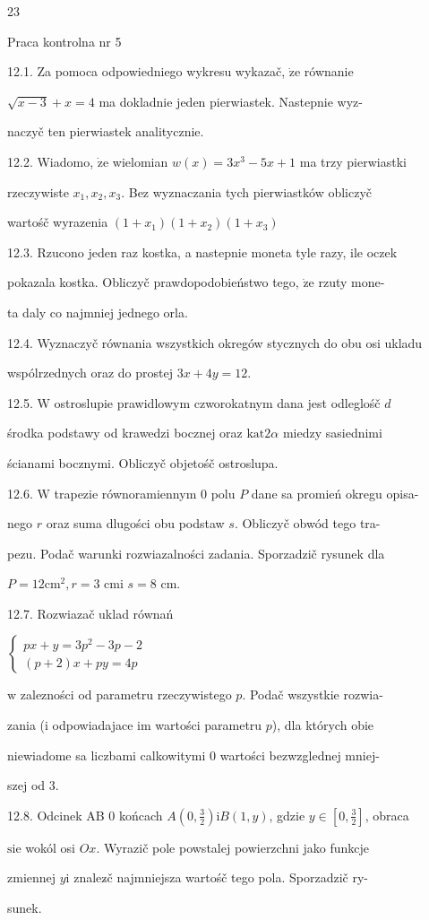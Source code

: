 \documentclass[a4paper,12pt]{article}
\begin{document}
23

Praca kontrolna nr 5

12.1. Za pomoca odpowiedniego wykresu wykazač, $\dot{\mathrm{z}}\mathrm{e}$ równanie

$\sqrt{x-3}+x = 4$ ma dokladnie jeden pierwiastek. Nastepnie wyz-

naczyč ten pierwiastek analitycznie.

12.2. Wiadomo, $\dot{\mathrm{z}}\mathrm{e}$ wielomian $w(x) = 3x^{3}-5x+1$ ma trzy pierwiastki

rzeczywiste $x_{1}, x_{2}, x_{3}$. Bez wyznaczania tych pierwiastków obliczyč

wartośč wyrazenia $(1+x_{1})(1+x_{2})(1+x_{3})$

12.3. Rzucono jeden raz kostka, a nastepnie moneta tyle razy, ile oczek

pokazala kostka. Obliczyč prawdopodobieństwo tego, $\dot{\mathrm{z}}\mathrm{e}$ rzuty mone-

ta daly co najmniej jednego orla.

12.4. Wyznaczyč równania wszystkich okregów stycznych do obu osi ukladu

wspólrzednych oraz do prostej $3x+4y=12.$

12.5. $\mathrm{W}$ ostroslupie prawidlowym czworokatnym dana jest odleglośč $d$

środka podstawy od krawedzi bocznej oraz $\mathrm{k}\mathrm{a}\mathrm{t}2\alpha$ miedzy sasiednimi

ścianami bocznymi. Obliczyč objetośč ostroslupa.

12.6. $\mathrm{W}$ trapezie równoramiennym $0$ polu $P$ dane sa promień okregu opisa-

nego $r$ oraz suma dlugości obu podstaw $s$. Obliczyč obwód tego tra-

pezu. Podač warunki rozwiazalności zadania. Sporzadzič rysunek dla

$P=12\mathrm{c}\mathrm{m}^{2}, r=3$ cmi $s=8$ cm.

12.7. Rozwiazač uklad równań

$\left\{\begin{array}{l}
px+y=3p^{2}-3p-2\\
(p+2)x+py=4p
\end{array}\right.$

$\mathrm{w}$ zalezności od parametru rzeczywistego $p$. Podač wszystkie rozwia-

zania ($\mathrm{i}$ odpowiadajace im wartości parametru $p$), dla których obie

niewiadome sa liczbami calkowitymi $0$ wartości bezwzglednej mniej-

szej od 3.

12.8. Odcinek AB $0$ końcach $A(0,\displaystyle \frac{3}{2}) \mathrm{i}B(1,y)$, gdzie $ y\in [0,\displaystyle \frac{3}{2}]$, obraca

$\mathrm{s}\mathrm{i}\mathrm{e}$ wokól osi $Ox$. Wyrazič pole powstalej powierzchni jako funkcje

zmiennej $y\mathrm{i}$ znalez$\acute{}$č najmniejsza wartośč tego pola. Sporzadzič ry-

sunek.
\end{document}
